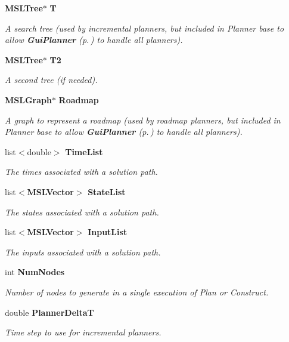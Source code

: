 \begin{CompactItemize}
{\bf MSLTree}$\ast$ {\bf T}
\begin{CompactList}\small\item\em A search tree (used by incremental planners, but included in Planner base to allow {\bf Gui\-Planner} {\rm (p.\,\pageref{class_GuiPlanner})} to handle all planners).\item\end{CompactList}\item 
{\bf MSLTree}$\ast$ {\bf T2}
\begin{CompactList}\small\item\em A second tree (if needed).\item\end{CompactList}\item 
{\bf MSLGraph}$\ast$ {\bf Roadmap}
\begin{CompactList}\small\item\em A graph to represent a roadmap (used by roadmap planners, but included in Planner base to allow {\bf Gui\-Planner} {\rm (p.\,\pageref{class_GuiPlanner})} to handle all planners).\item\end{CompactList}\item 
list$<$double$>$ {\bf Time\-List}
\begin{CompactList}\small\item\em The times associated with a solution path.\item\end{CompactList}\item 
list$<${\bf MSLVector}$>$ {\bf State\-List}
\begin{CompactList}\small\item\em The states associated with a solution path.\item\end{CompactList}\item 
list$<${\bf MSLVector}$>$ {\bf Input\-List}
\begin{CompactList}\small\item\em The inputs associated with a solution path.\item\end{CompactList}\item 
int {\bf Num\-Nodes}
\begin{CompactList}\small\item\em Number of nodes to generate in a single execution of Plan or Construct.\item\end{CompactList}\item 
double {\bf Planner\-Delta\-T}
\begin{CompactList}\small\item\em Time step to use for incremental planners.\item\end{CompactList}\end{CompactItemize}
